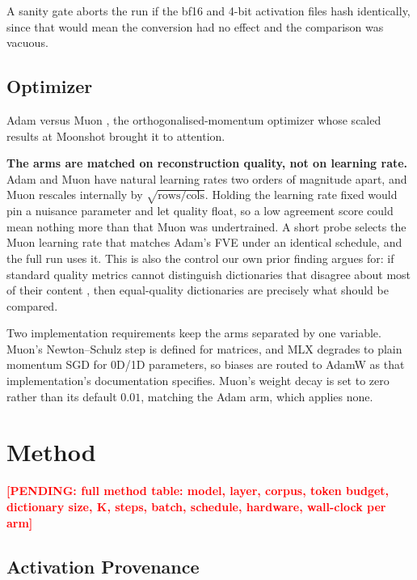 \documentclass[11pt,a4paper]{article}
\newcounter{pendingcount}
\DeclareRobustCommand{\pending}[1]{\stepcounter{pendingcount}%
  \textcolor{red}{\textbf{[PENDING: #1]}}}
\begin{document}
A sanity gate aborts the run if the bf16 and 4-bit activation files hash identically,
since that would mean the conversion had no effect and the comparison was vacuous.

\subsection{Optimizer}
\label{sec:optimizer}

Adam versus Muon \citep{jordan2024muon}, the orthogonalised-momentum optimizer whose
scaled results at Moonshot brought it to attention.

\textbf{The arms are matched on reconstruction quality, not on learning rate.} Adam and
Muon have natural learning rates two orders of magnitude apart, and Muon rescales
internally by $\sqrt{\text{rows}/\text{cols}}$. Holding the learning rate fixed would
pin a nuisance parameter and let quality float, so a low agreement score could mean
nothing more than that Muon was undertrained. A short probe selects the Muon learning
rate that matches Adam's FVE under an identical schedule, and the full run uses it.
This is also the control our own prior finding argues for: if standard quality metrics
cannot distinguish dictionaries that disagree about most of their content
\citep{melton2026sae}, then equal-quality dictionaries are precisely what should be
compared.

Two implementation requirements keep the arms separated by one variable. Muon's
Newton--Schulz step is defined for matrices, and MLX degrades to plain momentum SGD for
0D/1D parameters, so biases are routed to AdamW as that implementation's documentation
specifies. Muon's weight decay is set to zero rather than its default $0.01$, matching
the Adam arm, which applies none.

\section{Method}
\label{sec:method}

\pending{full method table: model, layer, corpus, token budget, dictionary size, K,
steps, batch, schedule, hardware, wall-clock per arm}

\subsection{Activation Provenance}
\label{sec:notrepro}
\end{document}
